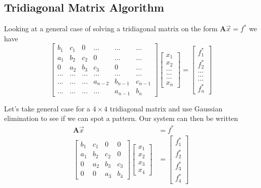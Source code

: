\documentclass[10pt, a4paper]{amsart}
\begin{document}
\subsection{Tridiagonal Matrix Algorithm}
Looking at a general case of solving a tridiagonal matrix on the form $\mathbf{A}\vec{x} = f^*$ we have 
\begin{equation} 
	\begin{bmatrix}
		b_1 & c_1 & 0 &\dots &\dots &\dots \\
		a_1 & b_2 & c_2 & 0 &\dots &\dots\\
		0 & a_2 & b_3 & c_3 & 0 &\dots \\
		\dots &\dots &\dots &\dots &\dots &\dots\\
		\dots &\dots &\dots & a_{n-2} & b_{n-1} & c_{n-1} \\
		\dots &\dots &\dots &\dots &a_{n-1} & b_n
	\end{bmatrix}
	\begin{bmatrix}
		x_1 \\
		x_2 \\
		\dots \\
		\dots \\
		\dots \\
		x_n
	\end{bmatrix} 
	= 
	\begin{bmatrix}
		f^*_1\\
		f^*_2\\
		\dots \\
		\dots \\
		\dots \\
		f^*_n
	\end{bmatrix}
\end{equation}

Let's take general case for a $4\times 4$ tridiagonal matrix and use Gaussian elimination to see if we can spot a pattern.
Our system can then be written 
\begin{align}
	\mathbf{A}\vec{x} &= f^*\nonumber\\
	\begin{bmatrix}
		b_1 & c_1 & 0 & 0\\
		a_1 & b_2 & c_2 & 0\\
		0 & a_2 & b_3 & c_3 \\
		0 & 0 & a_3 & b_4 
	\end{bmatrix}
	\begin{bmatrix}
		x_1\\
		x_2\\
		x_3\\
		x_4
	\end{bmatrix}
	&= 
	\begin{bmatrix}
		f^*_1\\
		f^*_2\\
		f^*_3\\
		f^*_4
	\end{bmatrix}
\end{align}
\end{document}
